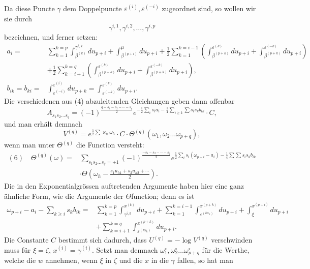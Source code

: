 \documentclass[10pt]{article}
\begin{document}
Da diese Puncte \(\gamma\) dem Doppelpuncte \(\varepsilon^{(i)},\varepsilon^{(-i)}\) zugeordnet sind, so wollen wir sie durch
\[
\gamma^{i,1},\gamma^{i,2},\ldots,\gamma^{i,p}
\]
bezeichnen, und ferner setzen:
\[
\begin{aligned}
a_i={}&\sum_{k=1}^{k=p}\int_{\beta^{(k)}}^{\gamma^{i,k}}du_{p+i}
+\int_{\beta^{(p+i)}}^{\mu}du_{p+i}
+\frac12\sum_{k=1}^{k=i-1}\left(\int_{\beta^{(p+k)}}^{\varepsilon^{(k)}}du_{p+i}+\int_{\beta^{(p+k)}}^{\varepsilon^{(-k)}}du_{p+i}\right)\\
&+\frac12\sum_{k=i+1}^{k=q}\left(\int_{\beta^{(p+k)}}^{\varepsilon^{(k)}}du_{p+i}+\int_{\beta^{(p+k)}}^{\varepsilon^{(-k)}}du_{p+i}\right),\\
b_{ik}=b_{ki}={}&\int_{\varepsilon^{(-i)}}^{\varepsilon^{(i)}}du_{p+k}=\int_{\varepsilon^{(-k)}}^{\varepsilon^{(k)}}du_{p+i}.
\end{aligned}
\]
Die verschiedenen aus (4) abzuleitenden Gleichungen geben dann offenbar
\[
A_{s_1s_2\ldots s_q}=(-1)^{\frac{q-s_1-s_2-\cdots-s_q}{2}}
 e^{-\frac12\sum_i s_ia_i-\frac14\sum_{i\ge k}\sum s_is_kb_{ik}}\cdot C,
\]
und man erhält demnach
\[
V^{(q)}=e^{\frac12\sum\varkappa_h\omega_h}\cdot C\cdot \Theta^{(q)}(\omega_1,\omega_2\ldots\omega_{p+q}),
\]
wenn man unter \(\Theta^{(q)}\) die Function versteht:
\[
\begin{aligned}
(6)\quad \Theta^{(q)}(\omega)={}&
\sum_{s_1s_2\ldots s_q=\pm1}
(-1)^{\frac{-s_1-s_2-\cdots-s_q}{2}}
 e^{\frac12\sum_i s_i(\omega_{p+i}-a_i)-\frac14\sum\sum s_is_kb_{ik}}\\
&\cdot\Theta\left(\omega_h-\frac{s_1u_{h1}+s_2u_{h2}+\cdots}{2}\right).
\end{aligned}
\]
Die in den Exponentialgrössen auftretenden Argumente haben hier eine ganz ähnliche Form, wie die Argumente der \(\Theta\)function; denn es ist
\[
\begin{aligned}
\omega_{p+i}-a_i-\sum_{k\ge i}s_kb_{ik}
={}&\sum_{k=1}^{k=p}\int_{\gamma^{i,k}}^{x^{(k)}}du_{p+i}
+\sum_{k=1}^{k=i-1}\int_{\varepsilon^{(ks_k)}}^{x^{(p+k)}}du_{p+i}
+\int_{\xi}^{x^{(p+i)}}du_{p+i}\\
&+\sum_{k=i+1}^{k=q}\int_{\varepsilon^{(ks_k)}}^{x^{(p+k)}}du_{p+i}.
\end{aligned}
\]
Die Constante \(C\) bestimmt sich dadurch, dass \(U^{(q)}=-\log V^{(q)}\) verschwinden muss für \(\xi=\zeta\), \(x^{(i)}=\gamma^{(i)}\). Setzt man demnach \(\omega_1^\circ,\omega_2^\circ\ldots\omega_{p+q}^\circ\) für die Werthe, welche die \(w\) annehmen, wenn \(\xi\) in \(\zeta\) und die \(x\) in die \(\gamma\) fallen, so hat man
\end{document}
